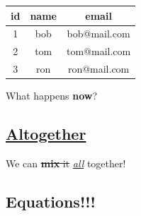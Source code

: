 \documentclass{article}
\begin{document}
\noindent
\begin{tabular}{| c | c | c |}
\hline 
id
&name
&email
\\
\hline 
1
&bob
&bob@mail.com
\\
\hline 
2
&tom
&tom@mail.com
\\
\hline 
3
&ron
&ron@mail.com
\\
\hline 
\end{tabular}

What happens \textbf{now}?
\subsection{\underline{Altogether}}
We can \sout{\textbf{mix} it}  \underline{\textit{all}} together!
\subsection{Equations!!!}
\end{document}
